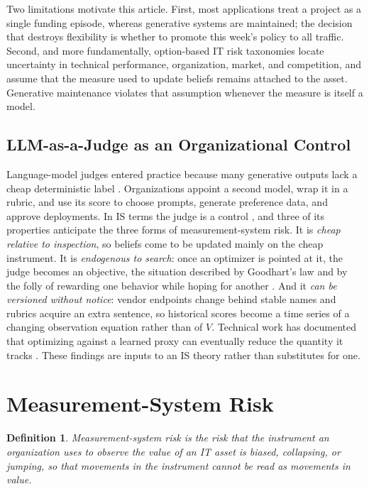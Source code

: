 \documentclass[acmsmall,screen,review]{acmart}
\theoremstyle{acmdefinition}
\newtheorem{construct}{Definition}
\begin{document}
Two limitations motivate this article. First, most applications treat a project as a single funding episode, whereas generative systems are maintained; the decision that destroys flexibility is whether to promote this week's policy to all traffic. Second, and more fundamentally, option-based IT risk taxonomies locate uncertainty in technical performance, organization, market, and competition, and assume that the measure used to update beliefs remains attached to the asset. Generative maintenance violates that assumption whenever the measure is itself a model.

\subsection{LLM-as-a-Judge as an Organizational Control}

Language-model judges entered practice because many generative outputs lack a cheap deterministic label \citep{zheng2023}. Organizations appoint a second model, wrap it in a rubric, and use its score to choose prompts, generate preference data, and approve deployments. In IS terms the judge is a control \citep{ouchi1979}, and three of its properties anticipate the three forms of measurement-system risk. It is \emph{cheap relative to inspection}, so beliefs come to be updated mainly on the cheap instrument. It is \emph{endogenous to search}: once an optimizer is pointed at it, the judge becomes an objective, the situation described by Goodhart's law \citep{manheim2018} and by the folly of rewarding one behavior while hoping for another \citep{kerr1975}. And it \emph{can be versioned without notice}: vendor endpoints change behind stable names and rubrics acquire an extra sentence, so historical scores become a time series of a changing observation equation rather than of $V$. Technical work has documented that optimizing against a learned proxy can eventually reduce the quantity it tracks \citep{gao2023}. These findings are inputs to an IS theory rather than substitutes for one.

\section{Measurement-System Risk}\label{sec:msr}

\begin{construct}
\emph{Measurement-system risk} is the risk that the instrument an organization uses to observe the value of an IT asset is biased, collapsing, or jumping, so that movements in the instrument cannot be read as movements in value.
\end{construct}
\end{document}
